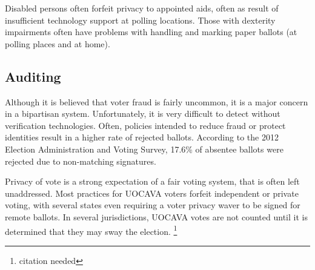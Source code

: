 Disabled persons often forfeit privacy to appointed aids,%
often as result of insufficient technology support at polling locations.
Those with dexterity impairments often have problems with handling and marking
paper ballots (at polling places and at
home).


\subsection{Auditing}
Although it is believed that voter fraud is fairly uncommon, it is a major
concern in a bipartisan system. Unfortunately, it is very difficult to detect
without verification technologies. Often, policies intended to reduce fraud
or protect identities result in a higher rate of rejected ballots. According
to the 2012 Election Administration and Voting Survey, 17.6\% of absentee
ballots were rejected due to non-matching signatures.

Privacy of vote is a strong expectation of a fair voting system, that is often
left unaddressed. Most practices for UOCAVA voters forfeit independent or
private voting, with several states even requiring a voter privacy waver to be
signed for remote ballots. In several jurisdictions, UOCAVA votes are not
counted until it is determined that they may sway the election.
\footnote{citation needed}


